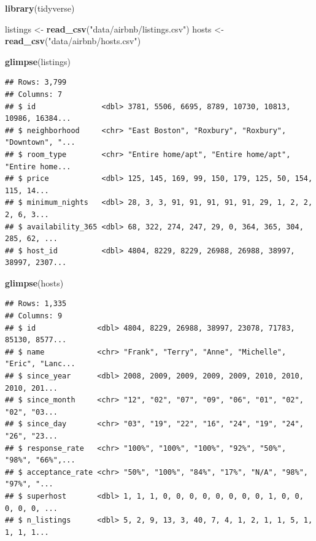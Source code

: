 \documentclass[
]{book}
\newenvironment{Shaded}{\begin{snugshade}}{\end{snugshade}}
\newcommand{\KeywordTok}[1]{\textcolor[rgb]{0.13,0.29,0.53}{\textbf{#1}}}
\newcommand{\NormalTok}[1]{#1}
\newcommand{\StringTok}[1]{\textcolor[rgb]{0.31,0.60,0.02}{#1}}
\begin{document}
\begin{Shaded}
\begin{Highlighting}[]
\KeywordTok{library}\NormalTok{(tidyverse)}

\NormalTok{listings \textless{}{-}}\StringTok{ }\KeywordTok{read\_csv}\NormalTok{(}\StringTok{"data/airbnb/listings.csv"}\NormalTok{)}
\NormalTok{hosts \textless{}{-}}\StringTok{ }\KeywordTok{read\_csv}\NormalTok{(}\StringTok{"data/airbnb/hosts.csv"}\NormalTok{)}

\KeywordTok{glimpse}\NormalTok{(listings)}
\end{Highlighting}
\end{Shaded}

\begin{verbatim}
## Rows: 3,799
## Columns: 7
## $ id               <dbl> 3781, 5506, 6695, 8789, 10730, 10813, 10986, 16384...
## $ neighborhood     <chr> "East Boston", "Roxbury", "Roxbury", "Downtown", "...
## $ room_type        <chr> "Entire home/apt", "Entire home/apt", "Entire home...
## $ price            <dbl> 125, 145, 169, 99, 150, 179, 125, 50, 154, 115, 14...
## $ minimum_nights   <dbl> 28, 3, 3, 91, 91, 91, 91, 91, 29, 1, 2, 2, 2, 6, 3...
## $ availability_365 <dbl> 68, 322, 274, 247, 29, 0, 364, 365, 304, 285, 62, ...
## $ host_id          <dbl> 4804, 8229, 8229, 26988, 26988, 38997, 38997, 2307...
\end{verbatim}

\begin{Shaded}
\begin{Highlighting}[]
\KeywordTok{glimpse}\NormalTok{(hosts)}
\end{Highlighting}
\end{Shaded}

\begin{verbatim}
## Rows: 1,335
## Columns: 9
## $ id              <dbl> 4804, 8229, 26988, 38997, 23078, 71783, 85130, 8577...
## $ name            <chr> "Frank", "Terry", "Anne", "Michelle", "Eric", "Lanc...
## $ since_year      <dbl> 2008, 2009, 2009, 2009, 2009, 2010, 2010, 2010, 201...
## $ since_month     <chr> "12", "02", "07", "09", "06", "01", "02", "02", "03...
## $ since_day       <chr> "03", "19", "22", "16", "24", "19", "24", "26", "23...
## $ response_rate   <chr> "100%", "100%", "100%", "92%", "50%", "98%", "66%",...
## $ acceptance_rate <chr> "50%", "100%", "84%", "17%", "N/A", "98%", "97%", "...
## $ superhost       <dbl> 1, 1, 1, 0, 0, 0, 0, 0, 0, 0, 0, 1, 0, 0, 0, 0, 0, ...
## $ n_listings      <dbl> 5, 2, 9, 13, 3, 40, 7, 4, 1, 2, 1, 1, 5, 1, 1, 1, 1...
\end{verbatim}
\end{document}
